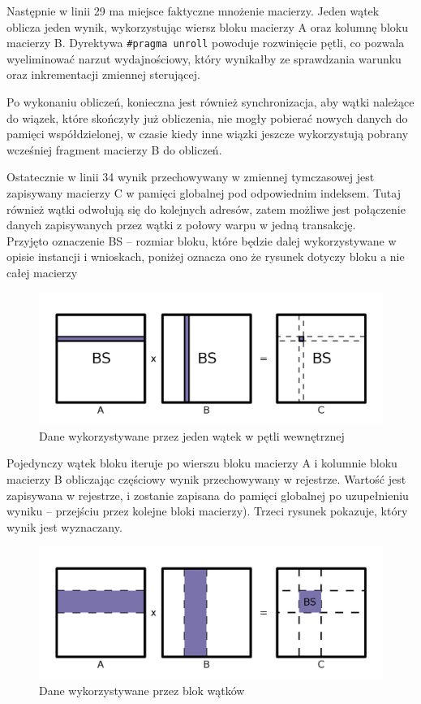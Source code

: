 \documentclass[12pt,a4paper]{article}
\begin{document}
Następnie w linii 29 ma miejsce faktyczne mnożenie macierzy. Jeden wątek oblicza jeden wynik, wykorzystując wiersz bloku macierzy A oraz kolumnę bloku macierzy B. Dyrektywa \verb|#pragma unroll| powoduje rozwinięcie pętli, co pozwala wyeliminować narzut wydajnościowy, który wynikałby ze sprawdzania warunku oraz inkrementacji zmiennej sterującej.

Po wykonaniu obliczeń, konieczna jest również synchronizacja, aby wątki należące do wiązek, które skończyły już obliczenia, nie mogły pobierać nowych danych do pamięci współdzielonej, w czasie kiedy inne wiązki jeszcze wykorzystują pobrany wcześniej fragment macierzy B do obliczeń.

Ostatecznie w linii 34 wynik przechowywany w zmiennej tymczasowej jest zapisywany macierzy C w pamięci globalnej pod odpowiednim indeksem. Tutaj również wątki odwołują się do kolejnych adresów, zatem możliwe jest połączenie danych zapisywanych przez wątki z połowy warpu w jedną transakcję.\\


{\footnotesize Przyjęto oznaczenie BS -- rozmiar bloku, które będzie dalej wykorzystywane w opisie instancji i wnioskach, poniżej oznacza ono że rysunek dotyczy bloku a nie całej macierzy}
\vspace{-0.3cm}
\begin{figure}[H]
  \centering
  \includegraphics[width=\linewidth, trim={0 50px 0 90px}, clip=true]{images/2.jpg}
  \caption{Dane wykorzystywane przez jeden wątek w pętli wewnętrznej}
  \label{fig:matrix2}
\end{figure}
Pojedynczy wątek bloku iteruje po wierszu bloku macierzy A i kolumnie bloku macierzy B obliczając częściowy wynik przechowywany w rejestrze. Wartość jest zapisywana w rejestrze, i zostanie zapisana do pamięci globalnej po uzupełnieniu wyniku -- przejściu przez kolejne bloki macierzy). Trzeci rysunek pokazuje, który wynik jest wyznaczany.


\begin{figure}[H]
  \centering
  \includegraphics[width=\linewidth, trim={0 50px 0 90px}, clip=true]{images/1.jpg}
  \caption{Dane wykorzystywane przez blok wątków}
  \label{fig:matrix1}
\end{figure}
\end{document}
